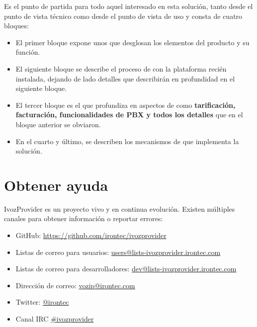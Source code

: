\documentclass[letterpaper,10pt,spanish]{sphinxmanual}
\begin{document}
Es el punto de partida para todo aquel interesado en esta solución, tanto desde el punto de vista técnico como desde el punto de vista de uso y consta de cuatro bloques:
\begin{itemize}
\item {} 
El primer bloque expone unos {\hyperref[index:concepts]{}} que desglosan los elementos del producto y su función.

\item {} 
El siguiente bloque se describe el proceso de {\hyperref[index:installation]{}} con la plataforma recién instalada, dejando de lado detalles que describirán en profundidad en el siguiente bloque.

\item {} 
El tercer bloque es el que profundiza en aspectos de {\hyperref[index:advanced]{}} como \textbf{tarificación, facturación, funcionalidades de PBX y todos los detalles} que en el bloque anterior se obviaron.

\item {} 
En el cuarto y último, se describen los mecanismos de {\hyperref[index:security]{}} que implementa la solución.

\end{itemize}


\section{Obtener ayuda}
\label{intro/getting_help:getting-help}\label{intro/getting_help::doc}\label{intro/getting_help:obtener-ayuda}
IvozProvider es un proyecto vivo y en continua evolución. Existen múltiples canales para obtener información o reportar errores:
\begin{itemize}
\item {} 
GitHub: \url{https://github.com/irontec/ivozprovider}

\item {} 
Listas de correo para usuarios: \href{mailto:users@lists-ivozprovider.irontec.com}{users@lists-ivozprovider.irontec.com}

\item {} 
Listas de correo para desarrolladores: \href{mailto:dev@lists-ivozprovider.irontec.com}{dev@lists-ivozprovider.irontec.com}

\item {} 
Dirección de correo: \href{mailto:vozip@irontec.com}{vozip@irontec.com}

\item {} 
Twitter: \href{https://twitter.com/irontec}{@irontec}

\item {} 
Canal IRC \href{https://webchat.freenode.net/?channels=ivozprovider}{\#ivozprovider}

\end{itemize}
\end{document}
